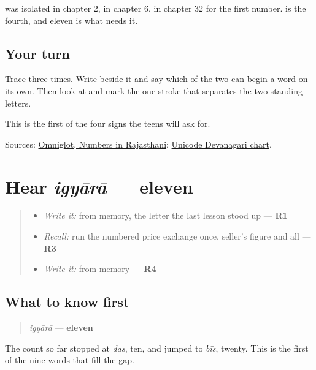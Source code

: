 \textbf{} was isolated in chapter 2, \textbf{} in chapter 6, \textbf{} in chapter 32 for the first number. \textbf{} is the fourth, and eleven is what needs it.

\subsection*{Your turn}
Trace \textbf{} three times. Write \textbf{} beside it and say which of the two can begin a word on its own. Then look at \textbf{} and mark the one stroke that separates the two standing letters.

\begin{tcolorbox}[breakable,colback=teal!4,colframe=teal!35!black,title={Before you move on}]
This is the first of the four signs the teens will ask for.

Sources: \href{https://www.omniglot.com/language/numbers/rajasthani.htm}{Omniglot, Numbers in Rajasthani}; \href{https://www.unicode.org/charts/PDF/U0900.pdf}{Unicode Devanagari chart}.
\end{tcolorbox}
\section[igyārā]{Hear \emph{igyārā} — eleven}

\label{lesson:MW-C37-hear-igyaara}



\begin{quote}
\begin{itemize}
\raggedright
  \item \emph{Write it:} \textbf{} from memory, the letter the last lesson stood up — \textbf{R1}
  \item \emph{Recall:} run the numbered price exchange once, seller's figure and all — \textbf{R3}
  \item \emph{Write it:} \textbf{  } from memory — \textbf{R4}
\end{itemize}
\end{quote}

\subsection*{What to know first}
\begin{quote}
\emph{igyārā} — \textbf{eleven}
\end{quote}

The count so far stopped at \emph{das}, ten, and jumped to \emph{bīs}, twenty. This is the first of the nine words that fill the gap.

